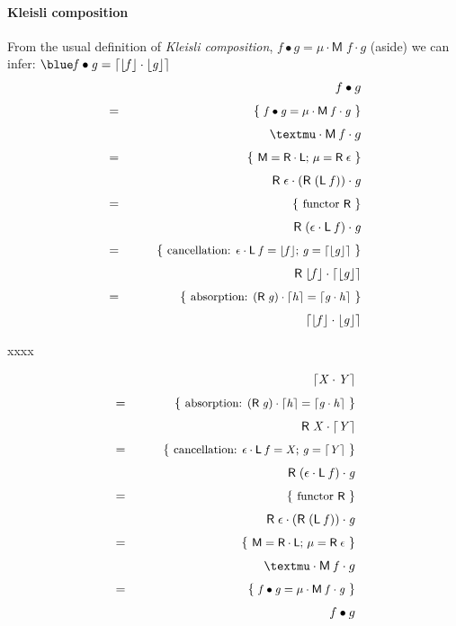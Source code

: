 \documentclass{elsarticle}
\newcommand{\Conid}[1]{\mathit{#1}}
\newcommand{\Varid}[1]{\mathit{#1}}
\def\comp{ \mathbin{\cdot} }
\def\fun#1{\mathsf{#1}}
\def\just#1#2{\\ &#1& \rule{2em}{0pt} \{ \mbox{\rule[-.7em]{0pt}{1.8em} \small #2 \/} \} \nonumber\\ && }
\def\kcomp{\mathbin{\bullet}}
\def\start{&&}
\begin{document}
\paragraph{Kleisli composition}
From the usual definition of \emph{Kleisli composition},
\ensuremath{\Varid{f}\kcomp\Varid{g}\mathrel{=}\mu \comp \fun M \;\Varid{f} \comp \Varid{g}}
(aside) we can infer:
	\ensuremath{{\blue \Varid{f}\kcomp\Varid{g}\mathrel{=}\lceil \lfloor \Varid{f}\rfloor \comp \lfloor \Varid{g}\rfloor\rceil}}
\begin{eqnarray*}
\start
	f \kcomp g
%
\just={ \ensuremath{\Varid{f}\kcomp\Varid{g}\mathrel{=}\mu \comp \fun M \;\Varid{f} \comp \Varid{g}}} %
%
	µ \comp \ensuremath{\fun M \;\Varid{f}} \comp g
%
\just={ \ensuremath{\fun M \mathrel{=}\fun R  \comp \fun L }; \ensuremath{\mu\mathrel{=}\fun R \;\epsilon } }
%
	\ensuremath{\fun R \;\epsilon  \comp (\fun R \;(\fun L \;\Varid{f})) \comp \Varid{g}}
%
\just={ functor \ensuremath{\fun R } }
%
	\ensuremath{\fun R \;(\epsilon  \comp \fun L \;\Varid{f}) \comp \Varid{g}}
%
\just={ cancellation: \ensuremath{\epsilon  \comp \fun L \;\Varid{f}\mathrel{=}\lfloor \Varid{f}\rfloor}; \ensuremath{\Varid{g}\mathrel{=}\lceil \lfloor \Varid{g}\rfloor\rceil} }
%
	\ensuremath{\fun R \;\lfloor \Varid{f}\rfloor \comp \lceil \lfloor \Varid{g}\rfloor\rceil}
%
\just={ absorption: \ensuremath{(\fun R \;\Varid{g}) \comp \lceil \Varid{h}\rceil\mathrel{=}\lceil \Varid{g} \comp \Varid{h}\rceil} }
%
	\ensuremath{\lceil \lfloor \Varid{f}\rfloor \comp \lfloor \Varid{g}\rfloor\rceil}
%
\end{eqnarray*}

xxxx


\begin{eqnarray*}
\start
	\ensuremath{\lceil \Conid{X} \comp \Conid{Y}\rceil}	
%	
\just={ absorption: \ensuremath{(\fun R \;\Varid{g}) \comp \lceil \Varid{h}\rceil\mathrel{=}\lceil \Varid{g} \comp \Varid{h}\rceil} }	
%	
	\ensuremath{\fun R \;\Conid{X} \comp \lceil \Conid{Y}\rceil}	
%	
\just={ cancellation: \ensuremath{\epsilon  \comp \fun L \;\Varid{f}\mathrel{=}\Conid{X}}; \ensuremath{\Varid{g}\mathrel{=}\lceil \Conid{Y}\rceil} }	
%	
	\ensuremath{\fun R \;(\epsilon  \comp \fun L \;\Varid{f}) \comp \Varid{g}}	
%	
\just={ functor \ensuremath{\fun R } }	
%	
	\ensuremath{\fun R \;\epsilon  \comp (\fun R \;(\fun L \;\Varid{f})) \comp \Varid{g}}	
%	
\just={ \ensuremath{\fun M \mathrel{=}\fun R  \comp \fun L }; \ensuremath{\mu\mathrel{=}\fun R \;\epsilon } }	
%	
	µ \comp \ensuremath{\fun M \;\Varid{f}} \comp g	
%	
\just={ \ensuremath{\Varid{f}\kcomp\Varid{g}\mathrel{=}\mu \comp \fun M \;\Varid{f} \comp \Varid{g}}} %
%	
	f \kcomp g	
%
\end{eqnarray*}
\end{document}
